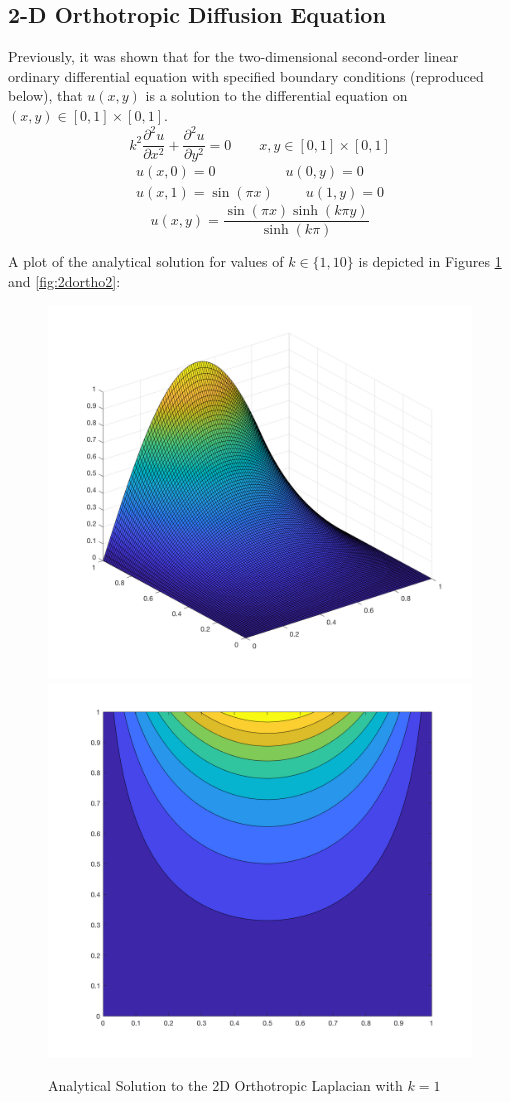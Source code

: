 \documentclass[10pt]{article}		%
\numberwithin{equation}{section}
\newcommand{\psder}[2]{\dfrac{\partial^2#1}{\partial#2^2}}		%
\begin{document}
\subsection{2-D Orthotropic Diffusion Equation}

Previously, it was shown that for the two-dimensional second-order linear ordinary differential equation with specified boundary conditions (reproduced below), that $u(x,y)$ is a solution to the differential equation on $(x, y) \in [0, 1] \times [0, 1]$.
\begin{equation}
k^2\psder{u}{x} + \psder{u}{y} = 0 \qquad x,y \in [0, 1] \times [0, 1]
\end{equation}
\begin{equation}
\begin{split}
u(x, 0) = 0 \qquad \qquad \quad u(0, y) = 0  \\
u(x, 1) = \sin(\pi x) \qquad \; u(1, y) = 0
\end{split}
\end{equation}
\begin{equation}
u(x, y) = \frac{\sin(\pi x) \sinh(k\pi y)}{\sinh(k\pi)}
\end{equation}

A plot of the analytical solution for values of $k \in \{1, 10\}$ is depicted in Figures \ref{fig:2dortho1} and \ref{fig:2dortho2}:

\begin{figure}[H]
	\begin{center}
		\includegraphics[width = 0.39\linewidth]{analytical_surface_k_1}
		\includegraphics[width = 0.39\linewidth]{analytical_contour_k_1}
		\caption{Analytical Solution to the 2D Orthotropic Laplacian with $k = 1$}
		\label{fig:2dortho1}
	\end{center}
\end{figure}
\end{document}
